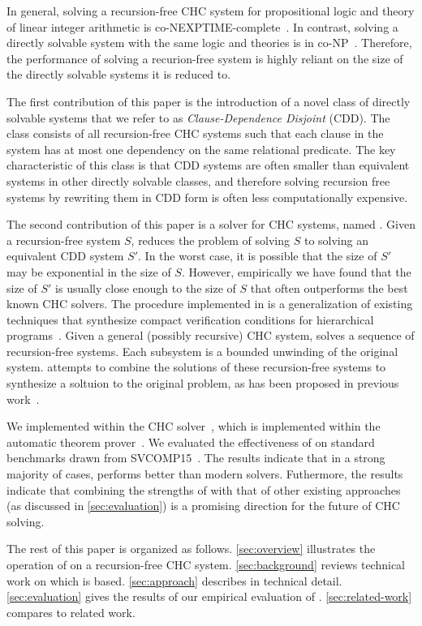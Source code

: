 In general, solving a recursion-free CHC system for 
propositional logic and theory of linear integer arithmetic is
co-NEXPTIME-complete~\cite{rummer13b}.
%
In contrast, solving a directly solvable system with the same logic and theories
is in co-NP~\cite{rummer13b}.
%
Therefore, the performance of solving a recurion-free system is highly reliant on the
size of the directly solvable systems it is reduced to.

The first contribution of this paper is the introduction of a novel
class of directly solvable systems that we refer to as
\emph{Clause-Dependence Disjoint} (CDD).
%
The class consists of all recursion-free CHC systems such that each
clause in the system has at most one dependency on the same relational
predicate.
%
The key characteristic of this class is that CDD systems are often
smaller than equivalent systems in other directly solvable classes,
and therefore solving recursion free systems by rewriting them in CDD
form is often less computationally expensive.

The second contribution of this paper is a solver for CHC systems,
named \sys.
%
Given a recursion-free system $S$, \sys reduces the problem
of solving $S$ to solving an equivalent CDD system
$S'$.
%
In the worst case, it is possible that the size of $S'$ may be
exponential in the size of $S$.
%
However, empirically we have found that the size of $S'$ is usually
close enough to the size of $S$ that \sys often outperforms the best
known CHC solvers.
%
The procedure implemented in \sys is a generalization of existing
techniques that synthesize compact verification conditions for
hierarchical programs~\cite{flanagan01,lal-qadeer15}.
%
Given a general (possibly recursive) CHC system, \sys solves a
sequence of recursion-free systems.
%
Each subsystem is a bounded unwinding of the original system. \sys
attempts to combine the solutions of these recursion-free systems to
synthesize a soltuion to the original problem, as has been proposed
in previous work~\cite{rummer13b}.

We implemented \sys within the \duality CHC solver~\cite{bjorner13},
which is implemented within the \zthree automatic theorem
prover~\cite{moura08}.
%
We evaluated the effectiveness of \sys on standard benchmarks drawn
from SVCOMP15~\cite{svcomp15}.
%
The results indicate that in a strong majority of cases,
\sys performs better than modern solvers.
%
Futhermore, the results indicate that combining the strengths of \sys
with that of other existing approaches (as discussed in
\autoref{sec:evaluation}) is a promising direction for the future of
CHC solving.

The rest of this paper is organized as follows.
%
\autoref{sec:overview} illustrates the operation of \sys on a
recursion-free CHC system.
%
\autoref{sec:background} reviews technical work on which \sys is
based.
%
\autoref{sec:approach} describes \sys in technical detail.
%
\autoref{sec:evaluation} gives the results of our empirical evaluation
of \sys.
%
\autoref{sec:related-work} compares \sys to related work.

